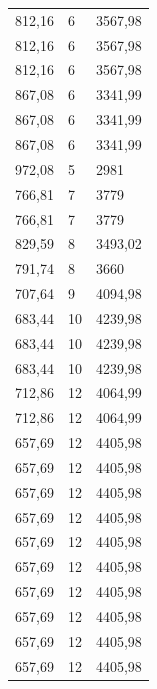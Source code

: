 \begin{center}
\begin{longtable}{|l|l|l|}
812,16            & 6                & 3567,98        \\
812,16            & 6                & 3567,98        \\
812,16            & 6                & 3567,98        \\
867,08            & 6                & 3341,99        \\
867,08            & 6                & 3341,99        \\
867,08            & 6                & 3341,99        \\
972,08            & 5                & 2981           \\
766,81            & 7                & 3779           \\
766,81            & 7                & 3779           \\
829,59            & 8                & 3493,02        \\
791,74            & 8                & 3660           \\
707,64            & 9                & 4094,98        \\
683,44            & 10               & 4239,98        \\
683,44            & 10               & 4239,98        \\
683,44            & 10               & 4239,98        \\
712,86            & 12               & 4064,99        \\
712,86            & 12               & 4064,99        \\
657,69            & 12               & 4405,98        \\
657,69            & 12               & 4405,98        \\
657,69            & 12               & 4405,98        \\
657,69            & 12               & 4405,98        \\
657,69            & 12               & 4405,98        \\
657,69            & 12               & 4405,98        \\
657,69            & 12               & 4405,98        \\
657,69            & 12               & 4405,98        \\
657,69            & 12               & 4405,98        \\
657,69            & 12               & 4405,98        \\

\end{longtable}
\end{center}
